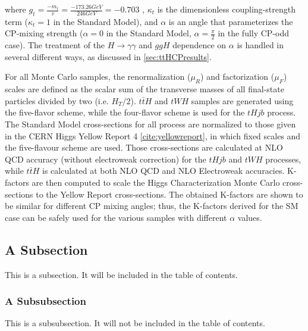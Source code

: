 where $g_{t} = \frac{-m_{t}}{v} = \frac{-173.26 GeV}{246 GeV} = -0.703$ , $\kappa_{t}$ is the dimensionless coupling-strength term ($\kappa_{t}= 1$ in the Standard Model), and $\alpha$ is an angle that parameterizes the CP-mixing strength ($\alpha = 0$ in the Standard Model, $\alpha = \frac{\pi}{2}$ in the fully CP-odd case). The treatment of the $H \rightarrow \gamma \gamma$ and $ggH$ dependence on $\alpha$ is handled in several different ways, as discussed in \ref{sec:ttHCPresults}.

For all Monte Carlo samples, the renormalization ($μ_{R}$) and factorization ($μ_{F}$) scales are defined as the scalar sum of the transverse masses of all final-state particles divided by two (i.e. $H_{T}/2$). $t\bar{t}H$ and $tWH$ samples are generated using the five-flavor scheme, while the four-flavor scheme is used for the $tHjb$ process. The Standard Model cross-sections for all process are normalized to those given in the CERN Higgs Yellow Report 4 \ref{cite:yellowreport}, in which fixed scales and the five-flavour scheme are used. Those cross-sections are calculated at NLO QCD accuracy (without electroweak correction) for the $tHjb$ and $tWH$ processes, while $t\bar{t}H$ is calculated at both NLO QCD and NLO Electroweak accuracies. K-factors are then computed to scale the Higgs Characterization Monte Carlo cross-sections to the Yellow Report cross-sections. The obtained K-factors are shown to be similar for different CP mixing angles; thus, the K-factors derived for the SM case can be safely used for the various samples with different $\alpha$ values.




\subsection{A Subsection} \label{sec:example_subsection} 

This is a subsection. It will be included in the table of contents. 

\subsubsection{A Subsubsection} \label{sec:example_subsubsection} 

This is a subsubsection. It will not be included in the table of contents. 

